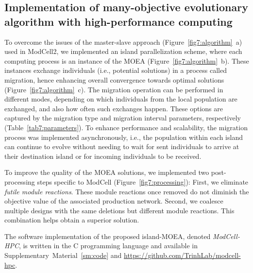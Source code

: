 {\subsection{Implementation of many-objective evolutionary algorithm with  high-performance computing}

To overcome the issues of the master-slave approach (Figure~\ref{fig7:algorithm}~a) used in ModCell2,\citep{garcia2019} we implemented an island parallelization scheme,\citep{alba2013} where each computing process is an instance of the MOEA (Figure~\ref{fig7:algorithm}~b).
These instances exchange individuals (i.e., potential solutions) in a process called migration, hence enhancing overall convergence towards optimal solutions (Figure~\ref{fig7:algorithm}~c).
The migration operation can be performed in different modes, depending on which individuals from the local population are exchanged, and also how often such exchanges happen.
These options are captured by the migration type and migration interval parameters, respectively (Table~\ref{tab7:parameters}).
To enhance performance and scalability, the migration process was implemented asynchronously, i.e., the population within each island can continue to evolve without needing to wait for sent individuals to arrive at their destination island or for incoming individuals to be received.

To improve the quality of the MOEA solutions, we implemented two post-processing steps specific to ModCell (Figure~\ref{fig7:processing}): First, we eliminate \emph{futile module reactions}. These module reactions once removed do not diminish the objective value of the associated production network. Second, we coalesce multiple designs with the same deletions but different module reactions. This combination helps obtain a superior solution.

The software implementation of the proposed island-MOEA, denoted \textit{ModCell-HPC}, is written in the C programming language and available in Supplementary~Material~\ref{sm:code} and \url{https://github.com/TrinhLab/modcell-hpc}.

}
